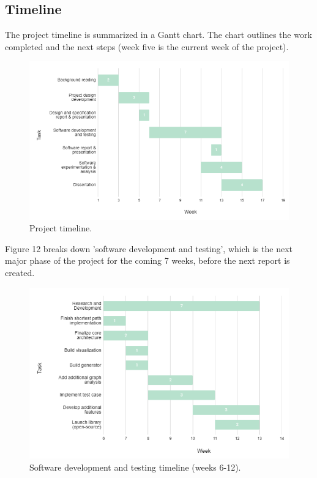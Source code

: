 \begin{plan}
\subsection{Timeline}
The project timeline is summarized in a Gantt chart\cite{gantt}.
The chart outlines the work completed and the next steps (week five is the current week of the project).
\begin{figure}[h]
    \centering
    \includegraphics[scale=0.7]{images/timeline.PNG}
    \caption{Project timeline.}
\end{figure}
\clearpage
Figure 12 breaks down 'software development and testing', which is the next major phase of the project for the coming 7 weeks, before the next report is created.
\begin{figure}[h]
    \centering
    \includegraphics[scale=0.7]{images/dev_timeline.PNG}
    \caption{Software development and testing timeline (weeks 6-12).}
\end{figure}
\end{plan}
\vspace{1cm}
\clearpage